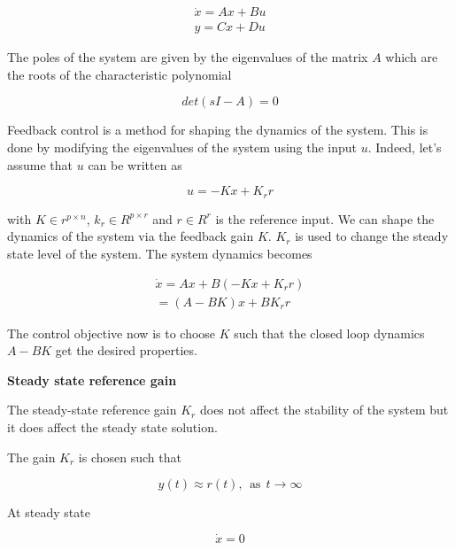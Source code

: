 \begin{eqnarray}
\dot{x} = Ax + Bu \\
y = Cx + Du
\end{eqnarray}

The poles of the system are given by the eigenvalues of the matrix $A$ which are the roots of the characteristic polynomial

\begin{equation}
det(sI-A) = 0
\end{equation}

Feedback control is a method for shaping the dynamics of the system. This is done by modifying the eigenvalues of the system using the input $u$. Indeed, let's assume that $u$
can be written as 

\begin{equation}
u = -Kx + K_r r
\end{equation}

with $K \in r^{p\times n}$, $k_r \in R^{p\times r}$ and $r \in R^r$ is the reference input. We can shape the dynamics of the system via the feedback gain $K$. $K_r$ is used to change the steady state level
of the system. The system dynamics becomes

\begin{eqnarray}
\dot{x} = Ax + B(-Kx + K_r r) \\
 = (A-BK)x + BK_r r
\end{eqnarray}

The control objective now is to choose $K$ such that the closed loop dynamics $A-BK$ get the desired properties.



\begin{framed}
\theoremstyle{remark}
\begin{remark}{\textbf{Steady state reference gain}}

The steady-state reference gain $K_r$ does not affect the stability of the system but it does affect the steady state solution.
\end{remark}
\end{framed}


The gain $K_r$ is chosen such that 

\begin{equation}
y(t) \approx r(t), ~~ \text{as} ~~ t \rightarrow \infty
\end{equation}

At steady state

\begin{equation}
\dot{x} = 0 
\end{equation}

